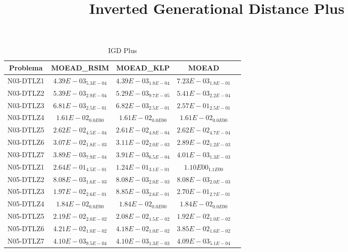 \documentclass{article}
\title{Inverted Generational Distance Plus}
\author{}
\begin{document}
\maketitle
\begin{table*}[ht!]
\scriptsize
\caption{IGD Plus}
\centering\begin{tabular}{|c||c||c||c||c|} \hline
Problema &MOEAD_RSIM &MOEAD_KLP &MOEAD\\\hline
N03-DTLZ1 &\cellcolor{gray25}$4.39E-03_{5.3E-04}$ &\cellcolor{gray95}$4.39E-03_{1.8E-04}$ &$7.23E-03_{1.8E-01}$\\ 
\hline
N03-DTLZ2 &\cellcolor{gray25}$5.39E-03_{2.9E-04}$ &\cellcolor{gray95}$5.29E-03_{9.7E-05}$ &$5.41E-03_{2.2E-04}$\\ 
\hline
N03-DTLZ3 &\cellcolor{gray95}$6.81E-03_{2.5E-01}$ &\cellcolor{gray25}$6.82E-03_{2.5E-01}$ &$2.57E-01_{2.5E-01}$\\ 
\hline
N03-DTLZ4 &\cellcolor{gray95}$1.61E-02_{0.0E00}$ &\cellcolor{gray25}$1.61E-02_{0.0E00}$ &$1.61E-02_{0.0E00}$\\ 
\hline
N03-DTLZ5 &$2.62E-02_{4.5E-04}$ &\cellcolor{gray95}$2.61E-02_{4.8E-04}$ &\cellcolor{gray25}$2.62E-02_{4.7E-04}$\\ 
\hline
N03-DTLZ6 &\cellcolor{gray25}$3.07E-02_{1.8E-03}$ &$3.11E-02_{2.0E-03}$ &\cellcolor{gray95}$2.89E-02_{1.2E-03}$\\ 
\hline
N03-DTLZ7 &\cellcolor{gray95}$3.89E-03_{7.9E-04}$ &\cellcolor{gray25}$3.91E-03_{6.5E-04}$ &$4.01E-03_{1.3E-03}$\\ 
\hline
N05-DTLZ1 &\cellcolor{gray25}$2.64E-01_{4.5E-01}$ &\cellcolor{gray95}$1.24E-01_{3.1E-01}$ &$1.10E00_{1.1E00}$\\ 
\hline
N05-DTLZ2 &\cellcolor{gray95}$8.08E-03_{1.6E-03}$ &$8.08E-03_{2.0E-03}$ &\cellcolor{gray25}$8.08E-03_{2.0E-03}$\\ 
\hline
N05-DTLZ3 &\cellcolor{gray25}$1.97E-02_{2.6E-01}$ &\cellcolor{gray95}$8.85E-03_{2.6E-01}$ &$2.70E-01_{2.7E-01}$\\ 
\hline
N05-DTLZ4 &\cellcolor{gray95}$1.84E-02_{0.0E00}$ &\cellcolor{gray25}$1.84E-02_{0.0E00}$ &$1.84E-02_{0.0E00}$\\ 
\hline
N05-DTLZ5 &$2.19E-02_{2.0E-02}$ &\cellcolor{gray25}$2.08E-02_{1.5E-02}$ &\cellcolor{gray95}$1.92E-02_{1.0E-02}$\\ 
\hline
N05-DTLZ6 &$4.21E-02_{1.0E-02}$ &\cellcolor{gray25}$4.18E-02_{1.0E-02}$ &\cellcolor{gray95}$3.85E-02_{1.6E-02}$\\ 
\hline
N05-DTLZ7 &$4.10E-03_{9.5E-04}$ &\cellcolor{gray25}$4.10E-03_{1.3E-03}$ &\cellcolor{gray95}$4.09E-03_{5.1E-04}$\\ 

\end{tabular}
\end{table*}
\end{document}
